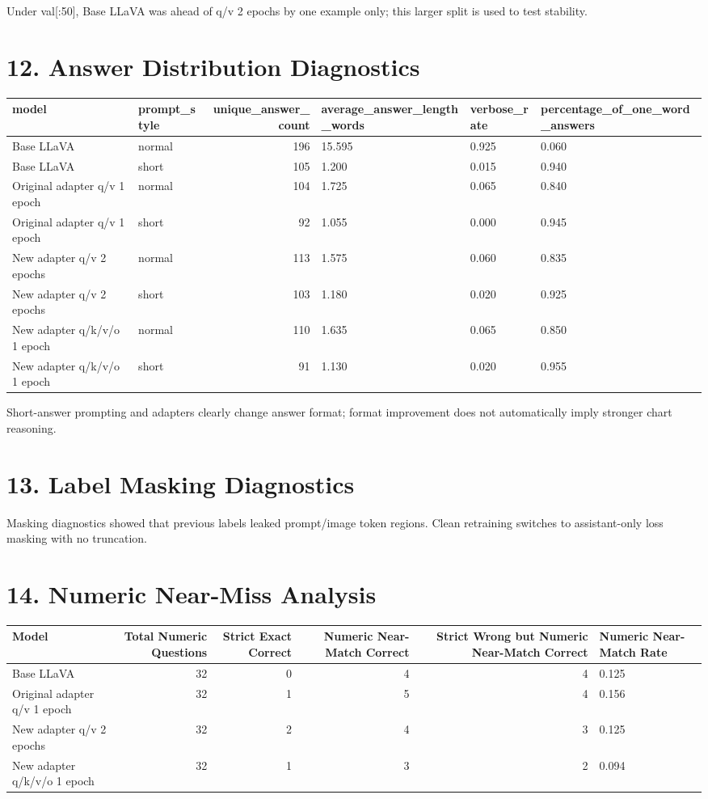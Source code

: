 \documentclass[11pt]{article}
\begin{document}
Under val[:50], Base LLaVA was ahead of q/v 2 epochs by one example only; this larger split is used to test stability.

\section*{12. Answer Distribution Diagnostics}
\begin{tabular}{llrlll}
\toprule
model & prompt\_style & unique\_answer\_count & average\_answer\_length\_words & verbose\_rate & percentage\_of\_one\_word\_answers \\
\midrule
Base LLaVA & normal & 196 & 15.595 & 0.925 & 0.060 \\
Base LLaVA & short & 105 & 1.200 & 0.015 & 0.940 \\
Original adapter q/v 1 epoch & normal & 104 & 1.725 & 0.065 & 0.840 \\
Original adapter q/v 1 epoch & short & 92 & 1.055 & 0.000 & 0.945 \\
New adapter q/v 2 epochs & normal & 113 & 1.575 & 0.060 & 0.835 \\
New adapter q/v 2 epochs & short & 103 & 1.180 & 0.020 & 0.925 \\
New adapter q/k/v/o 1 epoch & normal & 110 & 1.635 & 0.065 & 0.850 \\
New adapter q/k/v/o 1 epoch & short & 91 & 1.130 & 0.020 & 0.955 \\
\bottomrule
\end{tabular}

Short-answer prompting and adapters clearly change answer format; format improvement does not automatically imply stronger chart reasoning.

\section*{13. Label Masking Diagnostics}
Masking diagnostics showed that previous labels leaked prompt/image token regions. Clean retraining switches to assistant-only loss masking with no truncation.

\section*{14. Numeric Near-Miss Analysis}
\begin{tabular}{lrrrrl}
\toprule
Model & Total Numeric Questions & Strict Exact Correct & Numeric Near-Match Correct & Strict Wrong but Numeric Near-Match Correct & Numeric Near-Match Rate \\
\midrule
Base LLaVA & 32 & 0 & 4 & 4 & 0.125 \\
Original adapter q/v 1 epoch & 32 & 1 & 5 & 4 & 0.156 \\
New adapter q/v 2 epochs & 32 & 2 & 4 & 3 & 0.125 \\
New adapter q/k/v/o 1 epoch & 32 & 1 & 3 & 2 & 0.094 \\
\bottomrule
\end{tabular}
\end{document}
